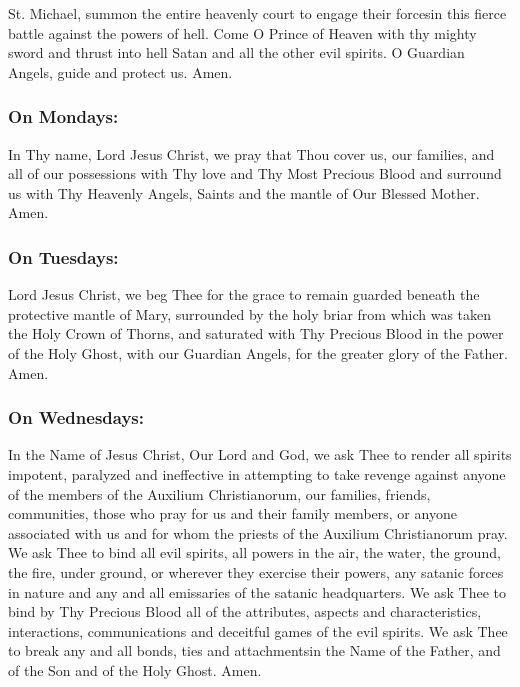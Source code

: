 \documentclass{article}
\begin{document}
\begin{multicols}{3}
St. Michael, summon the entire heavenly court to engage their forcesin this
fierce battle against the powers of hell. Come O Prince of Heaven with thy mighty
sword and thrust into hell Satan and all the other evil spirits. O Guardian Angels,
guide and protect us. Amen.

\subsubsection*{On Mondays:}
In Thy name, Lord Jesus Christ, we pray that Thou cover us, our families, and all
of our possessions with Thy love and Thy Most Precious Blood and surround us
with Thy Heavenly Angels, Saints and the mantle of Our Blessed Mother. Amen.

\subsubsection*{On Tuesdays:}
Lord Jesus Christ, we beg Thee for the grace to remain guarded beneath the
protective mantle of Mary, surrounded by the holy briar from which was taken the
Holy Crown of Thorns, and saturated with Thy Precious Blood in the power of the
Holy Ghost, with our Guardian Angels, for the greater glory of the Father. Amen.

\subsubsection*{On Wednesdays:}
In the Name of Jesus Christ, Our Lord and God, we ask Thee to render all spirits
impotent, paralyzed and ineffective in attempting to take revenge against anyone
of the members of the Auxilium Christianorum, our families, friends, communities,
those who pray for us and their family members, or anyone associated with us and
for whom the priests of the Auxilium Christianorum pray. We ask Thee to bind all
evil spirits, all powers in the air, the water, the ground, the fire, under ground, or
wherever they exercise their powers, any satanic forces in nature and any and all
emissaries of the satanic headquarters. We ask Thee to bind by Thy Precious Blood
all of the attributes, aspects and characteristics, interactions, communications and
deceitful games of the evil spirits. We ask Thee to break any and all bonds, ties and
attachmentsin the Name of the Father, and of the Son and of the Holy Ghost. Amen.

\begin{FlushLeft}

\end{FlushLeft}
\end{multicols}
\end{document}
